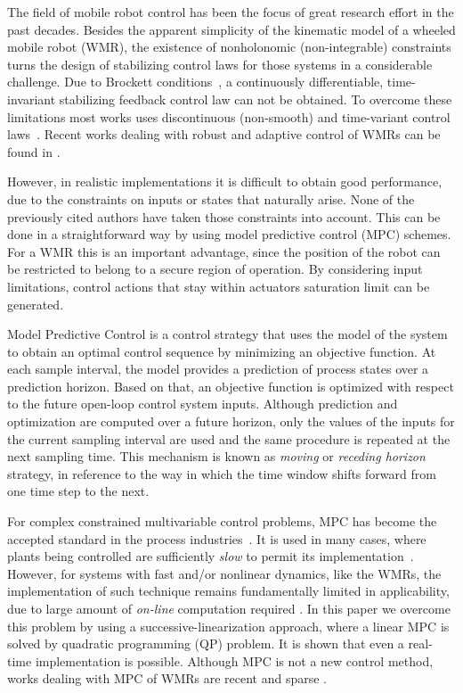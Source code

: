 \documentclass[conference]{IEEEtran} %
\begin{document}
The field of mobile robot control has been the focus of great research effort in the past decades. Besides the apparent simplicity of the kinematic model of a wheeled mobile robot (WMR), the existence of nonholonomic (non-integrable) constraints turns the design of stabilizing control laws for those systems in a considerable challenge. Due to Brockett
conditions~\cite{brockett82}, a continuously differentiable, time-invariant stabilizing feedback control law can not be obtained. To overcome these limitations most works uses discontinuous (non-smooth) and time-variant control laws~\cite{bloch89,samson91,canudas92,yamamoto94,murray97}. Recent works dealing with robust and adaptive control of WMRs can be found in \cite{oya03,dixon04}.

However, in realistic implementations it is difficult to obtain good performance, due to the constraints on inputs or states that naturally arise. None of the previously cited authors have taken those constraints into account. This can be done in a straightforward way by using model predictive control (MPC) schemes. For a WMR this is an important advantage,
since the position of the robot can be restricted to belong to a secure region of operation. By considering input limitations, control actions that stay within actuators saturation limit can be generated.

Model Predictive Control is a control strategy that uses the model of the system to obtain an optimal control sequence by minimizing an objective function. At each sample interval, the model provides a prediction of process states over a prediction horizon. Based on that, an objective function is optimized with respect to the future open-loop control system
inputs. Although prediction and optimization are computed over a future horizon, only the values of the inputs for the current sampling interval are used and the same procedure is repeated at the next sampling time. This mechanism is known as {\it moving} or {\it receding horizon} strategy, in reference to the way in which the time window shifts forward from one time step to the next.

For complex constrained multivariable control problems, MPC has become the
accepted standard in the process industries~\cite{bemporad02}. It is used in
many cases, where plants being controlled are
sufficiently {\em slow} to permit its implementation~\cite{mayne98}.
However, for systems with fast and/or nonlinear dynamics, like the WMRs,
the implementation of such technique remains fundamentally limited in
applicability, due to large amount of {\em on-line} computation required
\cite{cannon00}. In this paper we overcome this problem by using a
successive-linearization approach, where a linear MPC is solved by quadratic
programming (QP) problem. It is shown that
even a real-time implementation is possible. Although MPC is not a new
control method, works dealing with MPC of WMRs are recent and sparse
\cite{ollero91,rico99,essen01}.
\end{document}
